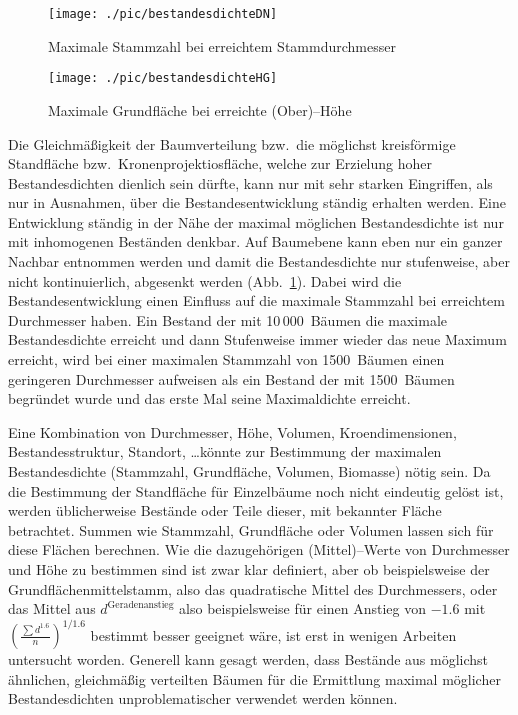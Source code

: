 \documentclass[twocolumn]{scrartcl}
\begin{document}
\begin{figure}[htbp]
  \centering
  \texttt{[image: ./pic/bestandesdichteDN]}
  \caption{Maximale Stammzahl bei erreichtem Stammdurchmesser}
  \label{fig:bestandesdichteDN}
\end{figure}

\begin{figure}[htbp]
  \centering
  \texttt{[image: ./pic/bestandesdichteHG]}
  \caption{Maximale Grundfläche bei erreichte (Ober)--Höhe}
  \label{fig:bestandesdichteHG}
\end{figure}

Die Gleichmäßigkeit der Baumverteilung bzw.\ die möglichst kreisförmige
Standfläche bzw.\ Kronenprojektiosfläche, welche zur Erzielung hoher
Bestandesdichten dienlich sein dürfte, kann nur mit sehr starken Eingriffen, als
nur in Ausnahmen, über die Bestandesentwicklung ständig erhalten werden. Eine
Entwicklung ständig in der Nähe der maximal möglichen Bestandesdichte ist nur
mit inhomogenen Beständen denkbar. Auf Baumebene kann eben nur ein ganzer
Nachbar entnommen werden und damit die Bestandesdichte nur stufenweise, aber
nicht kontinuierlich, abgesenkt werden (Abb.~\ref{fig:bestandesdichteDN}). Dabei
wird die Bestandesentwicklung einen Einfluss auf die maximale Stammzahl bei
erreichtem Durchmesser haben. Ein Bestand der mit 10\,000~Bäumen die maximale
Bestandesdichte erreicht und dann Stufenweise immer wieder das neue Maximum
erreicht, wird bei einer maximalen Stammzahl von 1500~Bäumen einen geringeren
Durchmesser aufweisen als ein Bestand der mit 1500~Bäumen begründet wurde und
das erste Mal seine Maximaldichte erreicht.

Eine Kombination von Durchmesser, Höhe, Volumen, Kroendimensionen,
Bestandesstruktur, Standort, \dots könnte zur Bestimmung der maximalen
Bestandesdichte (Stammzahl, Grundfläche, Volumen, Biomasse) nötig sein. Da die
Bestimmung der Standfläche für Einzelbäume noch nicht eindeutig gelöst ist,
werden üblicherweise Bestände oder Teile dieser, mit bekannter Fläche
betrachtet. Summen wie Stammzahl, Grundfläche oder Volumen lassen sich für diese
Flächen berechnen. Wie die dazugehörigen (Mittel)--Werte von Durchmesser und
Höhe zu bestimmen sind ist zwar klar definiert, aber ob beispielsweise der
Grundflächenmittelstamm, also das quadratische Mittel des Durchmessers, oder das
Mittel aus $d^\text{Geradenanstieg}$ also beispielsweise für einen Anstieg von
$-1.6$ mit $\left(\frac{\sum d^{1.6}}{n}\right)^{1/1.6}$ bestimmt besser
geeignet wäre, ist erst in wenigen Arbeiten untersucht worden. Generell kann
gesagt werden, dass Bestände aus möglichst ähnlichen, gleichmäßig verteilten
Bäumen für die Ermittlung maximal möglicher Bestandesdichten unproblematischer
verwendet werden können.
\end{document}
